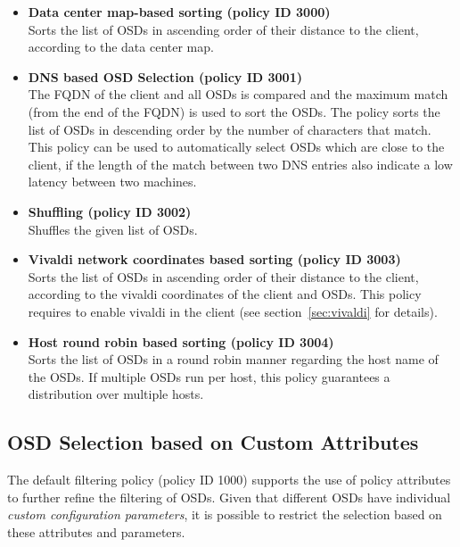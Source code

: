 \documentclass[a4paper,10pt]{book}
\begin{document}
\begin{itemize}

 \item \textbf{Data center map-based sorting (policy ID 3000)}\\
 Sorts the list of OSDs in ascending order of their distance to the client, according to the data center map.

 \item \textbf{DNS based OSD Selection (policy ID 3001)}\\
 The FQDN of the client and all OSDs is compared and the maximum match (from the end of the FQDN) is used to sort the OSDs. The policy sorts the list of OSDs in descending order by the number of characters that match. This policy can be used to automatically select OSDs which are close to the client, if the length of the match between two DNS entries also indicate a low latency between two machines.

 \item \textbf{Shuffling (policy ID 3002)}\\
 Shuffles the given list of OSDs.

 \item \textbf{Vivaldi network coordinates based sorting (policy ID 3003)}\\
 Sorts the list of OSDs in ascending order of their distance to the client, according to the vivaldi coordinates of the client and OSDs. This policy requires to enable vivaldi in the client (see section~\ref{sec:vivaldi} for details).

 \item \textbf{Host round robin based sorting (policy ID 3004)}\\
 Sorts the list of OSDs in a round robin manner regarding the host name of the OSDs. If multiple OSDs run per host, this policy guarantees a distribution over multiple hosts.

\end{itemize}

\subsection{OSD Selection based on Custom Attributes}
\label{sec:custom_osd_selection}
The default filtering policy (policy ID 1000) supports the use of policy attributes to further refine the filtering of OSDs. Given that different OSDs have individual \emph{custom configuration parameters}, it is possible to restrict the selection based on these attributes and parameters.
\end{document}
